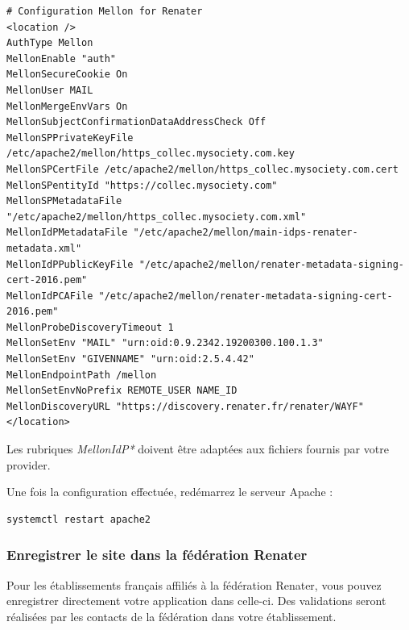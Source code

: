 \begin{lstlisting}
# Configuration Mellon for Renater
<location />
AuthType Mellon
MellonEnable "auth"
MellonSecureCookie On
MellonUser MAIL
MellonMergeEnvVars On
MellonSubjectConfirmationDataAddressCheck Off
MellonSPPrivateKeyFile /etc/apache2/mellon/https_collec.mysociety.com.key
MellonSPCertFile /etc/apache2/mellon/https_collec.mysociety.com.cert
MellonSPentityId "https://collec.mysociety.com"
MellonSPMetadataFile "/etc/apache2/mellon/https_collec.mysociety.com.xml"
MellonIdPMetadataFile "/etc/apache2/mellon/main-idps-renater-metadata.xml"
MellonIdPPublicKeyFile "/etc/apache2/mellon/renater-metadata-signing-cert-2016.pem"
MellonIdPCAFile "/etc/apache2/mellon/renater-metadata-signing-cert-2016.pem"
MellonProbeDiscoveryTimeout 1
MellonSetEnv "MAIL" "urn:oid:0.9.2342.19200300.100.1.3"
MellonSetEnv "GIVENNAME" "urn:oid:2.5.4.42"
MellonEndpointPath /mellon
MellonSetEnvNoPrefix REMOTE_USER NAME_ID
MellonDiscoveryURL "https://discovery.renater.fr/renater/WAYF"
</location>
\end{lstlisting}

Les rubriques \textit{MellonIdP*} doivent être adaptées aux fichiers fournis par votre provider.

Une fois la configuration effectuée, redémarrez le serveur Apache :

\begin{lstlisting}
systemctl restart apache2
\end{lstlisting}


\subsubsection{Enregistrer le site dans la fédération Renater}

Pour les établissements français affiliés à la fédération Renater, vous pouvez enregistrer directement votre application dans celle-ci. Des validations seront réalisées par les contacts de la fédération dans votre établissement.


